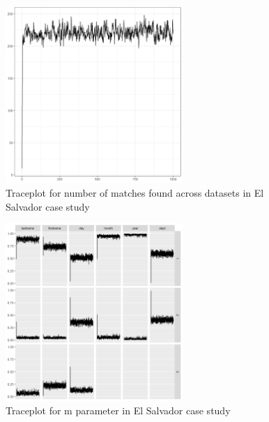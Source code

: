 \documentclass[12pt,letterpaper]{article}
\newcommand{\1}[1]{\mathbb{I}\!\left[#1\right]} %
\begin{document}
\begin{figure}[!h]
\begin{center}
\includegraphics[width=0.6\textwidth]{../notes/figures/el_salvador/overlap_trace} 
\caption{Traceplot for number of matches found across datasets in El Salvador case study}\label{fig:overlap_trace}
\end{center}
\end{figure}

\begin{figure}[!h]
\begin{center}
\includegraphics[width=0.6\textwidth]{../notes/figures/el_salvador/m_trace} 
\caption{Traceplot for m parameter in El Salvador case study}\label{fig:m_trace}
\end{center}
\end{figure}
\end{document}
